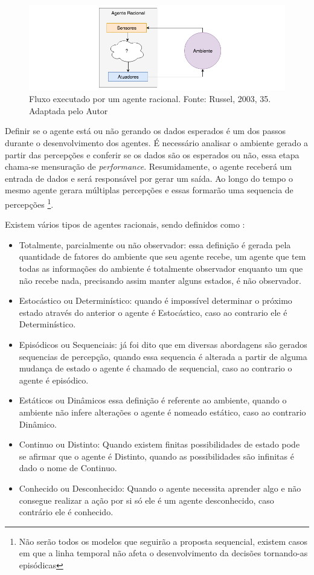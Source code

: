 \begin{figure}
    \centering
    \includegraphics[width=.8\textwidth]{imagens/rational_agent_draw.png}
    \caption{Fluxo executado por um agente racional. Fonte: Russel, 2003, 35. Adaptada pelo Autor}
    \label{fig:rational_agent_draw}
\end{figure}

Definir se o agente está ou não gerando os dados esperados é um dos passos durante o desenvolvimento dos agentes. É necessário analisar o ambiente gerado a partir das percepções e conferir se os dados são os esperados ou não, essa etapa chama-se mensuração de \textit{performance}. Resumidamente, o agente receberá um entrada de dados e será responsável por gerar um saída. Ao longo do tempo o mesmo agente gerara múltiplas percepções e essas formarão uma sequencia de percepções \footnote{Não serão todos os modelos que seguirão a proposta sequencial, existem casos em que a linha temporal não afeta o desenvolvimento da decisões tornando-as episódicas}.

Existem vários tipos de agentes racionais, sendo definidos como \cite[34-45]{russell2003artificial}:

\begin{itemize}
 \item Totalmente, parcialmente ou não observador: essa definição é gerada pela quantidade de fatores do ambiente que seu agente recebe, um agente que tem todas as informações do ambiente é totalmente observador enquanto um que não recebe nada, precisando assim manter alguns estados, é não observador.
 \item Estocástico ou Determinístico: quando é impossível determinar o próximo estado através do anterior o agente é Estocástico, caso ao contrario ele é Determinístico.
 \item Episódicos ou Sequenciais: já foi dito que em diversas abordagens são gerados sequencias de percepção, quando essa sequencia é alterada a partir de alguma mudança de estado o agente é chamado de sequencial, caso ao contrario o agente é episódico.
 \item Estáticos ou Dinâmicos essa definição é referente ao ambiente, quando o ambiente não infere alterações o agente é nomeado estático, caso ao contrario Dinâmico.
 \item Continuo ou Distinto: Quando existem finitas possibilidades de estado pode se afirmar que o agente é Distinto, quando as possibilidades são infinitas é dado o nome de Continuo.
 \item Conhecido ou Desconhecido: Quando o agente necessita aprender algo e não consegue realizar a ação por si só ele é um agente desconhecido, caso contrário ele é conhecido.
\end{itemize}

